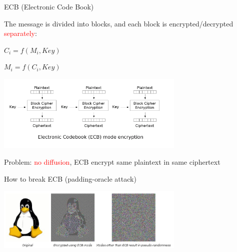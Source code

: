 \begin{frame}{ECB (Electronic Code Book)}

The message is divided into blocks, and each block is encrypted/decrypted \textcolor{red}{separately}:

\medskip

\centerline{$C_i = f(M_i, Key)$}

\centerline{$M_i = f(C_i, Key)$}

\medskip

\centerline{\includegraphics[width=9cm]{img/ECB.png}}

\medskip

Problem: \textcolor{red}{no diffusion}, ECB encrypt same plaintext in same ciphertext

\end{frame}

\begin{frame}{How to break ECB (padding-oracle attack)}

  \centerline{\includegraphics[width=9cm]{img/tux.jpg}}


\end{frame}

